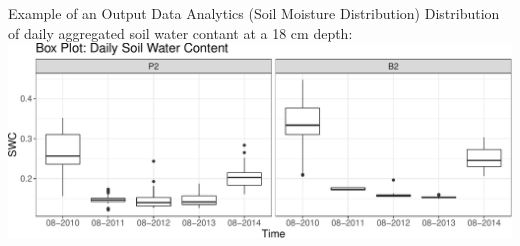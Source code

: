 \documentclass[
  ignorenonframetext,
]{beamer}
\begin{document}
\begin{frame}{Example of an Output Data Analytics (Soil Moisture
Distribution)}
\protect\hypertarget{example-of-an-output-data-analytics-soil-moisture-distribution}{}
Distribution of daily aggregated soil water contant at a 18 cm depth:
\includegraphics{cordanoe_geotopbricks_presenetation_files/figure-beamer/unnamed-chunk-15-1.pdf}
\end{frame}
\end{document}
